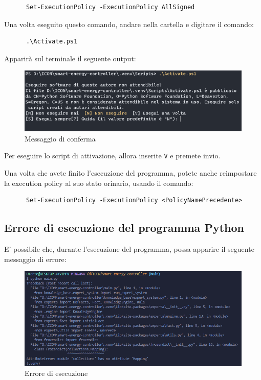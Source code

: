 \documentclass[12pt, letterpaper]{article}
\begin{document}
\begin{verbatim}
      Set-ExecutionPolicy -ExecutionPolicy AllSigned
\end{verbatim}

Una volta eseguito questo comando, andare nella cartella  e digitare il
comando:

\begin{verbatim}
      .\Activate.ps1
\end{verbatim}

Apparirà sul terminale il seguente output: \\

\begin{figure}[h]
      \centering
      \includegraphics[scale=0.6]{terminal-message.png}
      \caption{Messaggio di conferma}
\end{figure}

Per eseguire lo script di attivazione, allora inserite \texttt{V} e
premete invio. \\ \break

\noindent Una volta che avete finito l'esecuzione del programma, potete anche reimpostare
la execution policy al suo stato orinario, usando il comando:

\begin{verbatim}
      Set-ExecutionPolicy -ExecutionPolicy <PolicyNamePrecedente>
\end{verbatim}

\subsection{Errore di esecuzione del programma Python}
\label{sec:python-error}

E' possibile che, durante l'esecuzione del programma, possa apparire il seguente
messaggio di errore: \\ \pagebreak

\begin{figure}[h]
      \centering
      \includegraphics[scale=0.55]{errore-python.png}
      \caption{Errore di esecuzione}
\end{figure}
\end{document}
